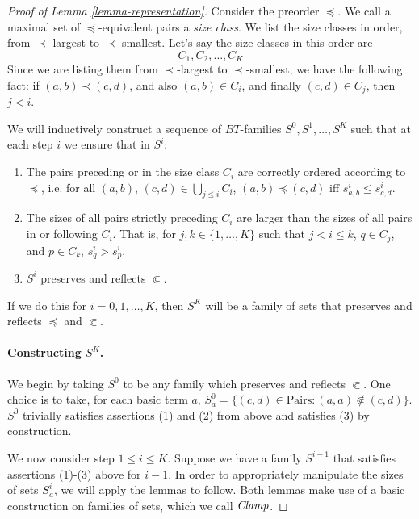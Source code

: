 \documentclass[letterpaper]{article}
\theoremstyle{definition}
\newcommand{\set}[1]{\{ #1 \}}
\newcommand{\Pairs}{\mbox{Pairs}}
\newcommand{\Clamp}{\protect{\mbox{\textit{Clamp}}}}
\newcommand{\precsubseteq}{\Subset}
\begin{document}
\begin{proof}[Proof of Lemma \ref{lemma-representation}]

Consider the preorder $\preceq$.  We call a maximal set of $\preceq$-equivalent pairs a \emph{size class}.  We list the size classes in order, from  $\prec$-largest to $\prec$-smallest. 
Let's say the size classes in this order are
    \[  C_1, C_2, \ldots, C_K \]
Since we are listing them from 
$\prec$-largest to 
$\prec$-smallest, we have the following fact:
if $(a,b) \prec (c,d)$, and also  $(a,b)\in C_i$, and finally
$(c,d)\in C_j$,
then $j < i$.

We will inductively construct a sequence of $BT$-families $S^0, S^1, \ldots, S^K$ such that at each step $i$ we ensure that in $S^i$:

\begin{enumerate}[(1)]
    \item The pairs preceding or in the size class $C_i$ are correctly ordered according to $\preceq$, i.e. for all $(a,b)$, $(c,d)\in \bigcup_{j\leq i} C_i$,
 $
        (a,b) \preceq  (c,d)$ iff 
        $s^i_{a,b}\leq s^i_{c,d}
        $.
    
    \item The sizes of all pairs strictly preceding $C_i$ are larger than the sizes of all pairs in or following $C_i$.
    That is, for $j, k \in \{1, \ldots, K\}$ such that $j < i \le k$, $q \in C_j$, and $p \in C_k$, $s^i_q > s^i_p$.
    
    \item $S^i$ preserves and reflects $\precsubseteq$.
\end{enumerate}
If we do this for $i = 0, 1, \ldots, K$, then $S^K$ will
be a family of sets that preserves and reflects $\preceq$ and $\precsubseteq$.

\paragraph{Constructing $S^K$.} 
We begin by taking $S^0$ to be any family
which preserves and reflects $\precsubseteq$.
One choice is to take, for each basic term $a$, $S^0_a = \set{(c, d) \in \Pairs : (a, a) \not \precsubseteq (c, d)}$.  $S^0$ trivially satisfies assertions (1) and (2) from above and satisfies (3) by construction.

We now consider step $1 \le i \le K$.  Suppose we have a family $S^{i-1}$ that satisfies assertions (1)-(3) above for $i-1$.  In order to appropriately manipulate the sizes of sets $S^i_a$, we will apply the lemmas to follow.  Both lemmas make use of a basic construction on families of sets, which we call \emph{$\Clamp$}.


\end{proof}
\end{document}
